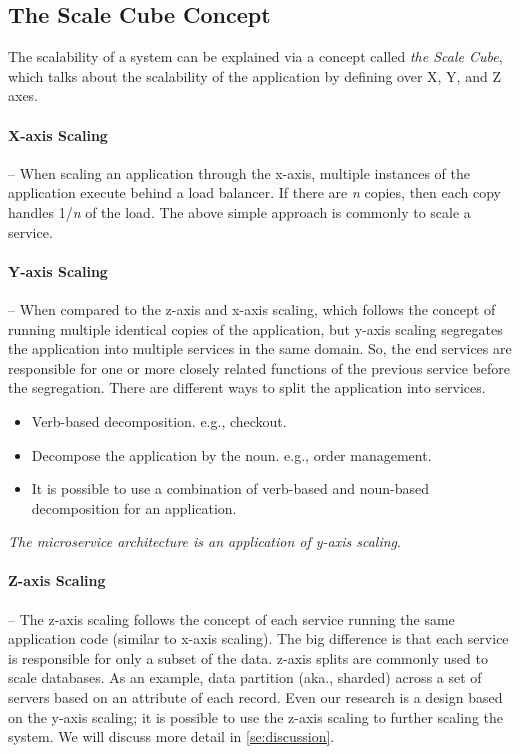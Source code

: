 \subsection{The Scale Cube Concept}
\label{subse:scale_cube}

The scalability of a system can be explained via a concept called \emph{the Scale Cube}, which talks about the scalability of the application by defining over X, Y, and Z axes.

\paragraph{X-axis Scaling}-- When scaling an application through the x-axis, multiple instances of the application execute behind a load balancer. If there are \textit{n} copies, then each copy handles 1/\textit{n} of the load. The above simple approach is commonly to scale a service.

\paragraph{Y-axis Scaling}-- When compared to the z-axis and x-axis scaling, which follows the concept of running multiple identical copies of the application, but y-axis scaling segregates the application into multiple services in the same domain. So, the end services are responsible for one or more closely related functions of the previous service before the segregation. There are different ways to split the application into services.
\begin{itemize}
    \item Verb-based decomposition. e.g., checkout.
    \item Decompose the application by the noun. e.g., order management.
    \item It is possible to use a combination of verb-based and noun-based decomposition for an application.
\end{itemize}
\emph{The microservice architecture is an application of y-axis scaling}.

\paragraph{Z-axis Scaling}-- The z-axis scaling follows the concept of each service running the same application code (similar to x-axis scaling). The big difference is that each service is responsible for only a subset of the data. z-axis splits are commonly used to scale databases. As an example, data partition (aka., sharded) across a set of servers based on an attribute of each record.
Even our research is a design based on the y-axis scaling; it is possible to use the z-axis scaling to further scaling the system. We will discuss more detail in \cref{se:discussion}.


